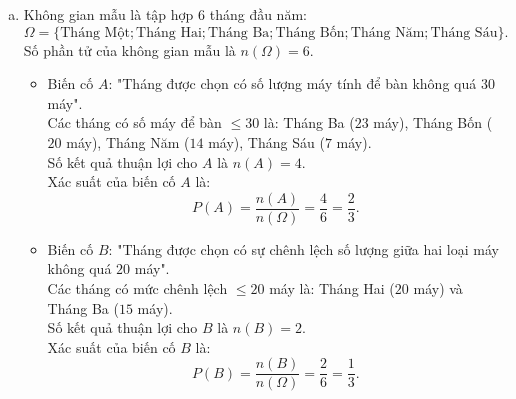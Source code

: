 \begin{bt}
{\begin{enumerate}[a)]
		So sánh các kết quả trên, ta thấy $15 < 20 < 29 < 30 < 50 < 52$.\\
		Vậy tháng Ba có sự chênh lệch giữa số lượng hai loại máy bán ra là ít nhất ($15$ máy).
		\item Không gian mẫu là tập hợp $6$ tháng đầu năm:
		$$\Omega = \{\text{Tháng Một}; \text{Tháng Hai}; \text{Tháng Ba}; \text{Tháng Bốn}; \text{Tháng Năm}; \text{Tháng Sáu}\}.$$
		Số phần tử của không gian mẫu là $n(\Omega) = 6$.
		\begin{itemize}
			\item Biến cố $A$: "Tháng được chọn có số lượng máy tính để bàn không quá $30$ máy".\\
			Các tháng có số máy để bàn $\le 30$ là: Tháng Ba ($23$ máy), Tháng Bốn ($20$ máy), Tháng Năm ($14$ máy), Tháng Sáu ($7$ máy).\\
			Số kết quả thuận lợi cho $A$ là $n(A) = 4$.\\
			Xác suất của biến cố $A$ là:
			$$P(A) = \frac{n(A)}{n(\Omega)} = \frac{4}{6} = \frac{2}{3}.$$
			\item Biến cố $B$: "Tháng được chọn có sự chênh lệch số lượng giữa hai loại máy không quá $20$ máy".\\
			Các tháng có mức chênh lệch $\le 20$ máy là: Tháng Hai ($20$ máy) và Tháng Ba ($15$ máy).\\
			Số kết quả thuận lợi cho $B$ là $n(B) = 2$.\\
			Xác suất của biến cố $B$ là:
			$$P(B) = \frac{n(B)}{n(\Omega)} = \frac{2}{6} = \frac{1}{3}.$$
		\end{itemize}
	\end{enumerate}
}
\end{bt}

